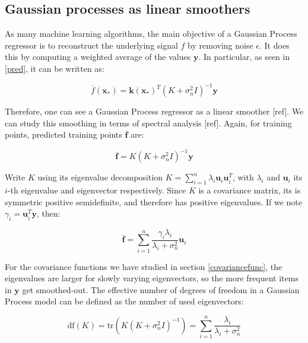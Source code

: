 \documentclass[10pt,a4paper,twoside]{book}
\begin{document}
\subsection{Gaussian processes as linear smoothers}

As many machine learning algorithms, the main objective of a Gaussian Process regressor is to reconstruct the underlying signal $f$ by removing noise $\epsilon$. It does this by computing a weighted average of the values $\boldsymbol{y}$. In particular, as seen in \ref{pred}, it can be written as:

\begin{equation}
\overline{f}(\boldsymbol{x}_*) = \boldsymbol{k}(\boldsymbol{x}_*)^T(K + \sigma_n^2 I)^{-1}\boldsymbol{y}
\end{equation}

Therefore, one can see a Gaussian Process regressor as a linear smoother [ref]. We can study this smoothing in terms of spectral analysis [ref]. Again, for training points, predicted training points $\overline{\boldsymbol{f}}$ are:

\begin{equation}
\overline{\boldsymbol{f}} = K(K + \sigma_n^2 I)^{-1}\boldsymbol{y}
\end{equation}

Write $K$ using its eigenvalue decomposition $K = \sum_{i=1}^n \lambda_i \boldsymbol{u}_i\boldsymbol{u}_i^T$, with $\lambda_i$ and $\boldsymbol{u}_i$ its $i$-th eigenvalue and eigenvector respectively. Since $K$ is a covariance matrix, its is symmetric positive semidefinite, and therefore has positive eigenvalues. If we note $\gamma_i = \boldsymbol{u}_i^T\boldsymbol{y}$, then:

\begin{equation}
\overline{\boldsymbol{f}} = \sum_{i=1}^n \dfrac{\gamma_i \lambda_i}{\lambda_i + \sigma^2_n}\boldsymbol{u}_i
\end{equation}

For the covariance functions we have studied in section \ref{covariancefunc}, the eigenvalues are larger for slowly varying eigenvectors, so the more frequent items in $\boldsymbol{y}$ get smoothed-out. The effective number of degrees of freedom in a Gaussian Process model can be defined as the number of used eigenvectors:

\begin{equation}
\mathrm{df}(K) = \mathrm{tr}(K(K + \sigma_n^2 I)^{-1}) = \sum_{i=1}^n\dfrac{\lambda_i}{\lambda_i + \sigma_n^2}
\end{equation}
\end{document}
